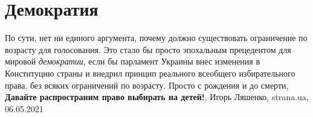  
 
 
 
 
\chapter{Демократия}
\label{sec:slova.demokratia}

По сути, нет ни единого аргумента, почему должно существовать ограничение по
возрасту для голосования. Это стало бы просто эпохальным прецедентом для
мировой \emph{демократии}, если бы парламент Украины внес изменения в
Конституцию страны и внедрил принцип реального всеобщего избирательного права,
без всяких ограничений по возрасту.  Просто с рождения и до смерти,
\textbf{Давайте распространим право выбирать на детей!},
Игорь Ляшенко, strana.ua, 06.05.2021

